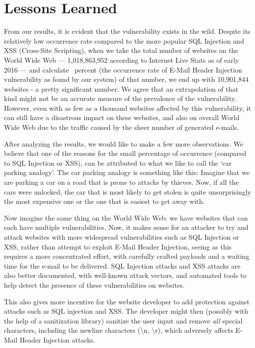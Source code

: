 \section{Lessons Learned}
    From our results, it is evident that the vulnerability exists in the wild. Despite its relatively low occurrence rate compared to the more popular SQL Injection and XSS (Cross-Site Scripting), when we take the total number of websites on the World Wide Web --- 1,018,863,952 according to Internet Live Stats \cite{InternetLiveStats2016} as of early 2016 --- and calculate \successDelta\ percent (the occurrence rate of E-Mail Header Injection vulnerability as found by our system) of that number, we end up with 10,901,844 websites - a pretty significant number. We agree that an extrapolation of that kind might not be an accurate measure of the prevalence of the vulnerability. However, even with as few as a thousand websites affected by this vulnerability, it can still have a disastrous impact on these websites, and also on overall World Wide Web due to the traffic caused by the sheer number of generated e-mails. 
    
    After analyzing the results, we would like to make a few more observations. We believe that one of the reasons for the small percentage of occurrence (compared to SQL Injection or XSS), can be attributed to what we like to call the `car parking analogy'.
    The car parking analogy is something like this: Imagine that we are parking a car on a road that is prone to attacks by thieves. Now, if all the cars were unlocked, the car that is most likely to get stolen is quite unsurprisingly the most expensive one or the one that is easiest to get away with.
    
    Now imagine the same thing on the World Wide Web: we have websites that can each have multiple vulnerabilities. Now, it makes sense for an attacker to try and attack websites with more widespread vulnerabilities such as SQL Injection or XSS, rather than attempt to exploit E-Mail Header Injection, seeing as this requires a more concentrated effort, with carefully crafted payloads and a waiting time for the e-mail to be delivered. SQL Injection attacks and XSS attacks are also better documented, with well-known attack vectors, and automated tools to help detect the presence of these vulnerabilities on websites.
    
    This also gives more incentive for the website developer to add protection against attacks such as SQL injection and XSS. The developer might then (possibly with the help of a sanitization library) sanitize the user input and remove \emph{all} special characters, including the newline characters (\textbackslash{}n, \textbackslash{}r), which adversely affects E-Mail Header Injection attacks.

